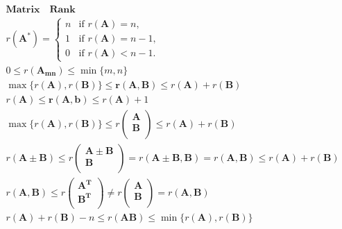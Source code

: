 \documentclass{article}
\begin{document}
\clearpage
\begin{align*}
    \bm{Matrix \quad Rank} \\       
    r(\mathbf{A}^{*}) = \begin{cases} 
            n & \text{if } r(\mathbf{A}) = n,\\ 
            1 & \text{if } r(\mathbf{A}) = n-1,\\ 
            0 & \text{if } r(\mathbf{A}) < n-1. 
    \end{cases} \\ 
    0 \le r(\mathbf{A_{mn}}) \le \min\{m, n\} \\
    \max\{r(\mathbf{A}),r(\mathbf{B})\} \le \mathbf{r(\mathbf{A},\mathbf{B})} \le r(\mathbf{A})+r(\mathbf{B}) \\
    r(\mathbf{A}) \le \mathbf{r(\mathbf{A},b)} \le r(\mathbf{A})+1 \\
    \max\{r(\mathbf{A}),r(\mathbf{B})\} \le r\left(
        \begin{array}{c}
            \mathbf{A} \\ 
            \mathbf{B} \\ 
         \end{array} 
    \right) \le r(\mathbf{A})+r(\mathbf{B}) \\   
    r(\mathbf{A}\pm\mathbf{B}) \le r\left(
        \begin{array}{c}
            \mathbf{A} \pm \mathbf{B} \\ 
            \mathbf{B} \\ 
         \end{array} 
    \right) = r(\mathbf{A}\pm\mathbf{B},\mathbf{B}) = r(\mathbf{A},\mathbf{B}) \le r(\mathbf{A})+r(\mathbf{B}) \\ 
    r(\mathbf{A},\mathbf{B}) \le r\left(
        \begin{array}{c}
            \mathbf{A}^{\mathbf{T}} \\ 
            \mathbf{B}^{\mathbf{T}} \\ 
        \end{array}
    \right) \neq r\left(
        \begin{array}{c}
            \mathbf{A} \\ 
            \mathbf{B} \\ 
        \end{array}
    \right) = r(\mathbf{A},\mathbf{B}) \\ 
    r(\mathbf{A})+r(\mathbf{B})-n \le r(\mathbf{AB}) \le \min\{r(\mathbf{A}),r(\mathbf{B})\} \\

\end{align*}
\end{document}
